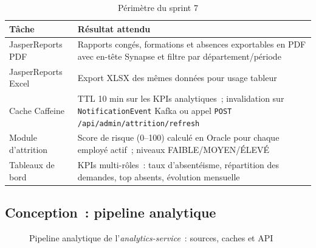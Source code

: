 \begin{table}[H]
\centering
\caption{Périmètre du sprint 7}
\label{tab:s7}
\begin{tabularx}{\textwidth}{|l|L|}
\hline
{}\textbf{Tâche} & \textbf{Résultat attendu} \\\hline
{}
JasperReports PDF & Rapports congés, formations et absences exportables en PDF
  avec en-tête Synapse et filtre par département/période \\\hline
JasperReports Excel & Export XLSX des mêmes données pour usage tableur \\\hline
{}
Cache Caffeine & TTL 10 min sur les KPIs analytiques~; invalidation sur
  \texttt{NotificationEvent} Kafka ou appel \texttt{POST /api/admin/attrition/refresh} \\\hline
Module d'attrition & Score de risque (0--100) calculé en Oracle pour chaque
  employé actif~; niveaux FAIBLE/MOYEN/ÉLEVÉ \\\hline
{}
Tableaux de bord & KPIs multi-rôles~: taux d'absentéisme, répartition des
  demandes, top absents, évolution mensuelle \\\hline
\end{tabularx}
\end{table}

\subsection{Conception~: pipeline analytique}

\begin{figure}[H]
\centering
{}
\caption{Pipeline analytique de l'\textit{analytics-service}~: sources, caches et API}
\label{fig:analytics}
\end{figure}

